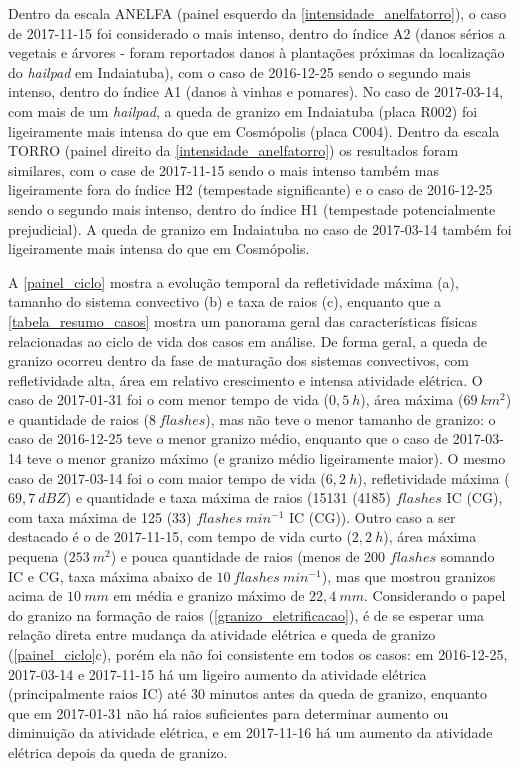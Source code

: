 Dentro da escala ANELFA (painel esquerdo da \autoref{intensidade_anelfatorro}), o caso de 2017-11-15 foi considerado o mais intenso, dentro do índice A2 (danos sérios a vegetais e árvores - foram reportados danos à plantações próximas da localização do \textit{hailpad} em Indaiatuba), com o caso de 2016-12-25 sendo o segundo mais intenso, dentro do índice A1 (danos à vinhas e pomares). No caso de 2017-03-14, com mais de um \textit{hailpad}, a queda de granizo em Indaiatuba (placa R002) foi ligeiramente mais intensa do que em Cosmópolis (placa C004). Dentro da escala TORRO (painel direito da \autoref{intensidade_anelfatorro}) os resultados foram similares, com o case de 2017-11-15 sendo o mais intenso também mas ligeiramente fora do índice H2 (tempestade significante) e o caso de 2016-12-25 sendo o segundo mais intenso, dentro do índice H1 (tempestade potencialmente prejudicial). A queda de granizo em Indaiatuba no caso de 2017-03-14 também foi ligeiramente mais intensa do que em Cosmópolis.

A \autoref{painel_ciclo} mostra a evolução temporal da refletividade máxima (a), tamanho do sistema convectivo (b) e taxa de raios (c), enquanto que a \autoref{tabela_resumo_casos} mostra um panorama geral das características físicas relacionadas ao ciclo de vida dos casos em análise. De forma geral, a queda de granizo ocorreu dentro da fase de maturação dos sistemas convectivos, com refletividade alta, área em relativo crescimento e intensa atividade elétrica. O caso de 2017-01-31 foi o com menor tempo de vida ($0,5\:h$), área máxima ($69\:km^2$) e quantidade de raios ($8\:flashes$), mas não teve o menor tamanho de granizo: o caso de 2016-12-25 teve o menor granizo médio, enquanto que o caso de 2017-03-14 teve o menor granizo máximo (e granizo médio ligeiramente maior). O mesmo caso de 2017-03-14 foi o com maior tempo de vida ($6,2\:h$), refletividade máxima ($69,7\:dBZ$) e quantidade e taxa máxima de raios (15131 (4185) $flashes$ IC (CG), com taxa máxima de 125 (33) $flashes\:min^{-1}$ IC (CG)). Outro caso a ser destacado é o de 2017-11-15, com tempo de vida curto ($2,2\:h$), área máxima pequena ($253\:m^2$) e pouca quantidade de raios (menos de 200 $flashes$ somando IC e CG, taxa máxima abaixo de $10\:flashes\:min^{-1}$), mas que mostrou granizos acima de $10\:mm$ em média e granizo máximo de $22,4\:mm$. Considerando o papel do granizo na formação de raios (\autoref{granizo_eletrificacao}), é de se esperar uma relação direta entre mudança da atividade elétrica e queda de granizo (\autoref{painel_ciclo}c), porém ela não foi consistente em todos os casos: em 2016-12-25, 2017-03-14 e 2017-11-15 há um ligeiro aumento da atividade elétrica (principalmente raios IC) até 30 minutos antes da queda de granizo, enquanto que em 2017-01-31 não há raios suficientes para determinar aumento ou diminuição da atividade elétrica, e em 2017-11-16 há um aumento da atividade elétrica depois da queda de granizo.

